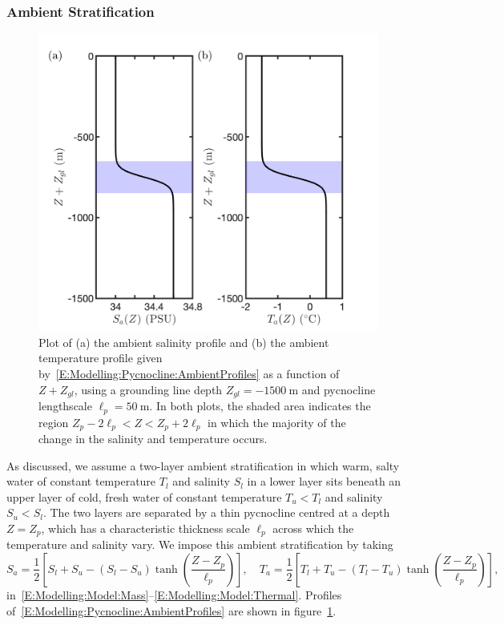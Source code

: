 \documentclass[openacc]{rsproca_new}%
\newcommand{\red}[1]{{\color{red} #1}}
\newcommand{\rout}[1]{\red{\st{#1}}}\newcommand{\ab}[1]{\textcolor{Green}{#1}}\newcommand{\about}[1]{\textcolor{Cyan}{\sout{#1}}}
\renewcommand{\rout}[1]{{}} %
\renewcommand{\red}[1]{{}} %
\begin{document}
\subsubsection{Ambient Stratification}\label{S:Model:Pycnocline}
\begin{figure}
\centering
\includegraphics[scale =0.4]{./make_plots/plots/figure2.png}
\caption{Plot of (a) the ambient salinity profile and (b) the ambient temperature profile given by~\eqref{E:Modelling:Pycnocline:AmbientProfiles} as a function of \rout{distance above sea level,} $Z + Z_{gl}$, using a grounding line depth $Z_{gl} = -1500~\si{\meter}$ and pycnocline lengthscale $\ell_p = 50~\si{\meter}$. In both plots, the shaded area indicates the region $Z_p - 2\ell_p < Z < Z_p + 2\ell_p$ in which the majority of the change in the salinity and temperature occurs.}\label{fig:Pycnocline_Profiles}
\end{figure}

As discussed, we assume a two-layer ambient stratification in which warm, salty water of constant temperature $T_l$ and salinity $S_l$ in a lower layer sits beneath an upper layer of cold, fresh water of constant temperature $T_u < T_l$ and salinity $S_u < S_l$. The two layers are separated by a thin pycnocline centred at a depth $Z = Z_p$, which has a characteristic thickness scale $\ell_p$ across which the temperature and salinity vary. We impose this ambient stratification by taking
\begin{equation}\label{E:Modelling:Pycnocline:AmbientProfiles}
S_a = \frac{1}{2}\left[S_l + S_u - (S_l - S_u)\tanh\left(\frac{Z - Z_p}{\ell_p}\right)\right], \quad
T_a = \frac{1}{2}\left[T_l + T_u - (T_l - T_u)\tanh\left(\frac{Z - Z_p}{\ell_p}\right)\right],
\end{equation} %
in~\eqref{E:Modelling:Model:Mass}--\eqref{E:Modelling:Model:Thermal}. Profiles of~\eqref{E:Modelling:Pycnocline:AmbientProfiles} are shown in figure~\ref{fig:Pycnocline_Profiles}. 
\end{document}
